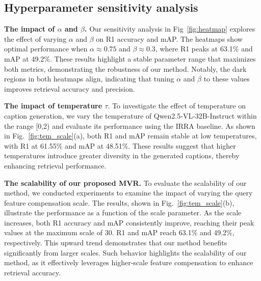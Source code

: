 \subsection{Hyperparameter sensitivity analysis}

\textbf{The impact of $\alpha$ and $\beta$.} Our sensitivity analysis in Fig~\ref{fig:heatmap} explores the effect of varying $\alpha$ and $\beta$ on R1 accuracy and mAP. The heatmaps show optimal performance when $\alpha \approx 0.75$ and $\beta \approx 0.3$, where R1 peaks at 63.1\% and mAP at 49.2\%. These results highlight a stable parameter range that maximizes both metrics, demonstrating the robustness of our method. Notably, the dark regions in both heatmaps align, indicating that tuning $\alpha$ and $\beta$ to these values improves retrieval accuracy and precision.

\noindent\textbf{The impact of temperature $\tau$}. To investigate the effect of temperature on caption generation, we vary the temperature of Qwen2.5-VL-32B-Instruct within the range [0,2) and evaluate its performance using the IRRA baseline. As shown in Fig.~\ref{fig:tem_scale}(a), both R1 and mAP remain stable at low temperatures, with R1 at 61.55\% and mAP at 48.51\%. These results suggest that higher temperatures introduce greater diversity in the generated captions, thereby enhancing retrieval performance.

\noindent\textbf{The scalability of our proposed MVR.} To evaluate the scalability of our method, we conducted experiments to examine the impact of varying the query feature compensation scale. The results, shown in Fig.~\ref{fig:tem_scale}(b), illustrate the performance as a function of the scale parameter. As the scale increases, both R1 accuracy and mAP consistently improve, reaching their peak values at the maximum scale of 30. R1 and mAP reach 63.1\% and 49.2\%, respectively. This upward trend demonstrates that our method benefits significantly from larger scales. Such behavior highlights the scalability of our method, as it effectively leverages higher-scale feature compensation to enhance retrieval accuracy. 

